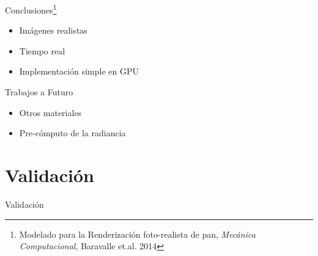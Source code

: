 \documentclass[spanish,unknownkeysallowed,10pt]{beamer}
\begin{document}








\begin{frame}{Conclusiones\footnote{Modelado para la Renderización foto-realista de pan, {\it Mecánica Computacional}, Baravalle et.al. 2014}}
\begin{itemize}
\item Imágenes realistas
\item Tiempo real
\item Implementación simple en GPU
\end{itemize}

\begin{block}{Trabajos a Futuro}
\begin{itemize}
\item Otros materiales
\item Pre-cómputo de la radiancia
\end{itemize}
\end{block}
\end{frame}

\section{Validación}



\begin{frame}
\begin{block}{}
\begin{center}
\vspace{1cm}
\huge{Validación}
\vspace{1cm}
\end{center}
\end{block}
\end{frame}
\end{document}
